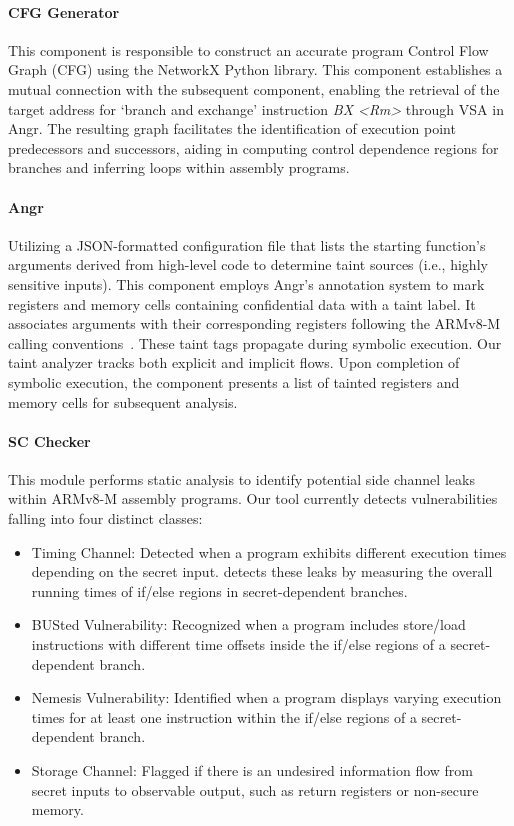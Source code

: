 \paragraph{\textbf{CFG Generator}}
%
This component is responsible to construct an accurate program Control Flow
Graph (CFG) using the NetworkX \cite{networkX} Python library. This
component establishes a mutual connection with the subsequent component,
enabling the retrieval of the target address for ‘branch and exchange’
instruction \textit{BX <Rm>} through \ac{VSA} in Angr. The resulting graph
facilitates the identification of execution point predecessors and
successors, aiding in computing control dependence regions for branches and
inferring loops within assembly programs.

\paragraph{\textbf{Angr}} Utilizing a JSON-formatted configuration file
that lists the starting function's arguments derived from high-level code
to determine taint sources (i.e., highly sensitive inputs). This component
employs Angr's annotation system to mark registers and memory cells
containing confidential data with a taint label. It associates arguments
with their corresponding registers following the ARMv8-M calling
conventions~\cite{armv8m_ref_manual}. These taint tags propagate during
symbolic execution. Our taint analyzer tracks both
explicit and implicit flows. Upon completion of symbolic execution, the
component presents a list of tainted registers and memory cells for
subsequent analysis. 

\paragraph{\textbf{SC Checker}} This module performs static analysis to
identify potential side channel leaks within ARMv8-M assembly programs. Our
\tool{} tool currently detects vulnerabilities
falling into four distinct classes:

\begin{itemize}
%
\item Timing Channel: Detected when a program exhibits different execution
times depending on the secret input. \tool{} detects
these leaks by measuring the overall running times of if/else regions
in secret-dependent branches.
%
\item BUSted Vulnerability: Recognized when a program includes store/load
instructions with different time offsets inside the if/else regions of a
secret-dependent branch.
%
\item Nemesis Vulnerability: Identified when a program displays varying
execution times for at least one instruction within the if/else regions of
a secret-dependent branch.
%
\item Storage Channel: Flagged if there is an undesired information flow
from secret inputs to observable output, such as return registers or
non-secure memory.
%
\end{itemize}


